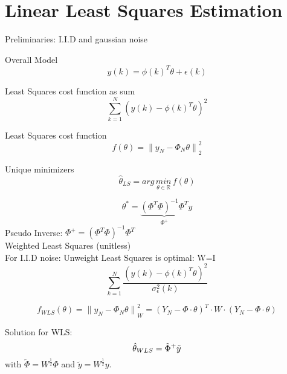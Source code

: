 
\section*{Linear Least Squares Estimation}
Preliminaries: I.I.D and gaussian noise

Overall Model
\begin{equation*}
y(k)={ \phi (k) }^{ T }\theta +\epsilon (k)
\end{equation*}

Least Squares cost function as sum
\begin{equation*}
\sum _{ k=1 }^{ N }{{ (y(k)-{ \phi (k) }^{ T }\theta )}^{2  } } 
\end{equation*}

Least Squares cost function
\begin{equation*}
f(\theta )={ \parallel {y  }_{N  }-{ \Phi }_{ N }\theta\parallel }_{ 2 }^{2  }
\end{equation*}

Unique minimizers
\begin{equation*}
\hat{\theta}_{LS} =arg \, \underset{ \theta \in \mathbb{R} }{ min } \, f(\theta)
\end{equation*}

\begin{equation*}
{ \theta  }^{ * }=\underbrace { { ({ \Phi  }^{ T }\Phi ) }^{ -1 }{ \Phi  }^{ T } }_{ { \Phi  }^{ + } } y
\end{equation*}
Pseudo Inverse: \qquad $\Phi ^{ + }={({ \Phi  }^{ T }\Phi ) }^{ -1 }{ \Phi  }^{ T }$\\

Weighted Least Squares (unitless)\\
For I.I.D noise: Unweight Least Squares is optimal: W=I
\begin{equation*}
\sum _{ k=1 }^{ N }\frac {{{ (y(k)-{ \phi (k) }^{ T }\theta )}^{2  } }}{\sigma_{\epsilon}^{2}(k)}
\end{equation*}


\begin{equation*}
{ f }_{ WLS }(\theta )={ \parallel { y }_{ N }-{ \Phi  }_{ N }\theta \parallel  }_{ W }^{ 2 }={ ({ Y }_{ N }-\Phi \cdot \theta ) }^{ T }\cdot W\cdot  ({ Y }_{ N }-\Phi \cdot \theta )
\end{equation*}

Solution for WLS:
\begin{equation*}
\hat{\theta}_{WLS} = \tilde{\Phi}^+\tilde{y} \\
\end{equation*}
with $\tilde{\Phi} = W^{\frac{1}{2}} \Phi$ and $\tilde{y} = W^{\frac{1}{2}} y$.


